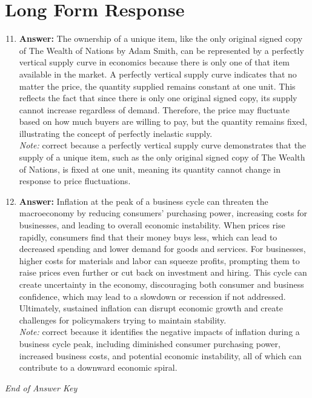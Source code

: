 \documentclass[12pt]{article}
\begin{document}
\section*{Long Form Response}
\begin{enumerate}[label=\arabic*.]
\setcounter{enumi}{10}
\item \textbf{Answer:} The ownership of a unique item, like the only original signed copy of The Wealth of Nations by Adam Smith, can be represented by a perfectly vertical supply curve in economics because there is only one of that item available in the market. A perfectly vertical supply curve indicates that no matter the price, the quantity supplied remains constant at one unit. This reflects the fact that since there is only one original signed copy, its supply cannot increase regardless of demand. Therefore, the price may fluctuate based on how much buyers are willing to pay, but the quantity remains fixed, illustrating the concept of perfectly inelastic supply.
\\ \textit{Note:} correct because a perfectly vertical supply curve demonstrates that the supply of a unique item, such as the only original signed copy of The Wealth of Nations, is fixed at one unit, meaning its quantity cannot change in response to price fluctuations.
\item \textbf{Answer:} Inflation at the peak of a business cycle can threaten the macroeconomy by reducing consumers' purchasing power, increasing costs for businesses, and leading to overall economic instability. When prices rise rapidly, consumers find that their money buys less, which can lead to decreased spending and lower demand for goods and services. For businesses, higher costs for materials and labor can squeeze profits, prompting them to raise prices even further or cut back on investment and hiring. This cycle can create uncertainty in the economy, discouraging both consumer and business confidence, which may lead to a slowdown or recession if not addressed. Ultimately, sustained inflation can disrupt economic growth and create challenges for policymakers trying to maintain stability.
\\ \textit{Note:} correct because it identifies the negative impacts of inflation during a business cycle peak, including diminished consumer purchasing power, increased business costs, and potential economic instability, all of which can contribute to a downward economic spiral.
\end{enumerate}

\vfill
\noindent\textit{End of Answer Key}
\end{document}
